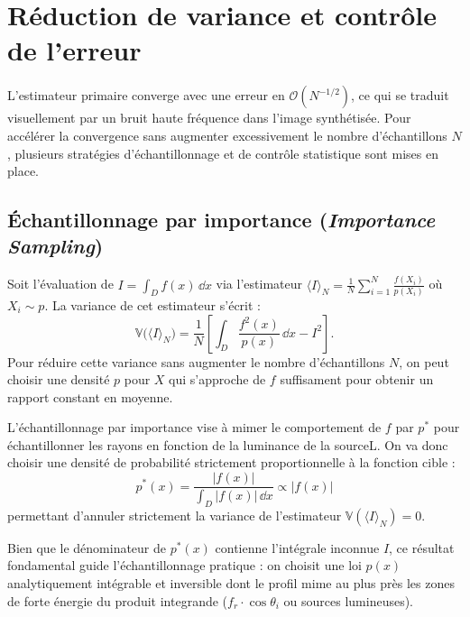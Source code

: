 \section{Réduction de variance et contrôle de l'erreur}

L'estimateur primaire converge avec une erreur en $\mathcal{O}(N^{-1/2})$, ce qui se traduit visuellement par un bruit haute fréquence dans l'image synthétisée. Pour accélérer la convergence sans augmenter excessivement le nombre d'échantillons $N$, plusieurs stratégies d'échantillonnage et de contrôle statistique sont mises en place.

\subsection{Échantillonnage par importance (\emph{Importance Sampling})}
\label{subsec:importance-sampling}

Soit l'évaluation de $I = \int_D f(x) \, \dd x$ via l'estimateur $\langle I \rangle_N = \frac{1}{N} \sum_{i=1}^N \frac{f(X_i)}{p(X_i)}$ où $X_i \sim p$. La variance de cet estimateur s'écrit :
\begin{equation}
    \mathbb{V}\big(\langle I \rangle_N\big) = \frac{1}{N} \left[ \int_D \frac{f^2(x)}{p(x)} \, \dd x - I^2 \right].
\end{equation}
Pour réduire cette variance sans augmenter le nombre d'échantillons $N$, on peut choisir une densité $p$ pour $X$ qui s'approche de $f$ suffisament pour obtenir un rapport constant en moyenne. 

\begin{proposition}
    L'échantillonnage par importance vise à mimer le comportement de $f$ par $p^*$ pour échantillonner les rayons en fonction de la luminance de la sourceL. On va donc choisir une densité de probabilité strictement proportionnelle à la fonction cible :
    \begin{equation}
        p^*(x) = \frac{|f(x)|}{\int_D |f(x)| \, \dd x} \propto |f(x)|
    \end{equation}
    permettant d'annuler strictement la variance de l'estimateur $\mathbb{V}(\langle I \rangle_N) = 0$.
\end{proposition}

\begin{remark}
    Bien que le dénominateur de $p^*(x)$ contienne l'intégrale inconnue $I$, ce résultat fondamental guide l'échantillonnage pratique : on choisit une loi $p(x)$ analytiquement intégrable et inversible dont le profil mime au plus près les zones de forte énergie du produit integrande ($f_r \cdot \cos\theta_i$ ou sources lumineuses).
\end{remark}

